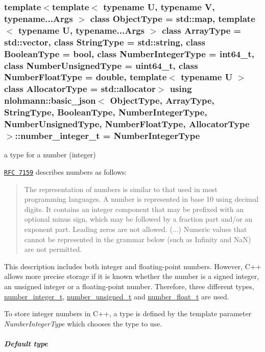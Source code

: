 \subsubsection[{\texorpdfstring{number\+\_\+integer\+\_\+t}{number\_integer\_t}}]{\setlength{\rightskip}{0pt plus 5cm}template$<$template$<$ typename U, typename V, typename...\+Args $>$ class Object\+Type = std\+::map, template$<$ typename U, typename...\+Args $>$ class Array\+Type = std\+::vector, class String\+Type  = std\+::string, class Boolean\+Type  = bool, class Number\+Integer\+Type  = int64\+\_\+t, class Number\+Unsigned\+Type  = uint64\+\_\+t, class Number\+Float\+Type  = double, template$<$ typename U $>$ class Allocator\+Type = std\+::allocator$>$ using {\bf nlohmann\+::basic\+\_\+json}$<$ Object\+Type, Array\+Type, String\+Type, Boolean\+Type, Number\+Integer\+Type, Number\+Unsigned\+Type, Number\+Float\+Type, Allocator\+Type $>$\+::{\bf number\+\_\+integer\+\_\+t} =  Number\+Integer\+Type}\hypertarget{a00025_ac4b10b2364f26ce47bdb9a413ff04a59}{}\label{a00025_ac4b10b2364f26ce47bdb9a413ff04a59}


a type for a number (integer) 

\href{http://rfc7159.net/rfc7159}{\tt R\+FC 7159} describes numbers as follows\+: \begin{quote}
The representation of numbers is similar to that used in most programming languages. A number is represented in base 10 using decimal digits. It contains an integer component that may be prefixed with an optional minus sign, which may be followed by a fraction part and/or an exponent part. Leading zeros are not allowed. (...) Numeric values that cannot be represented in the grammar below (such as Infinity and NaN) are not permitted. \end{quote}


This description includes both integer and floating-\/point numbers. However, C++ allows more precise storage if it is known whether the number is a signed integer, an unsigned integer or a floating-\/point number. Therefore, three different types, \hyperlink{a00025_ac4b10b2364f26ce47bdb9a413ff04a59}{number\+\_\+integer\+\_\+t}, \hyperlink{a00025_a60a04166c122072ab11eaf9845d9cd1d}{number\+\_\+unsigned\+\_\+t} and \hyperlink{a00025_a74a0013e847fdc574b48f931f0e757e1}{number\+\_\+float\+\_\+t} are used.

To store integer numbers in C++, a type is defined by the template parameter {\itshape Number\+Integer\+Type} which chooses the type to use.

\subparagraph*{Default type}

